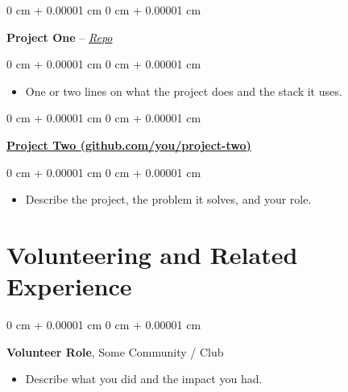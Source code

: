 \documentclass[10pt, letterpaper]{article}
\newenvironment{highlights}{
    \begin{itemize}[
        topsep=0.10 cm,
        parsep=0.10 cm,
        partopsep=0pt,
        itemsep=0pt,
        leftmargin=0 cm + 10pt
    ]
}{
    \end{itemize}
} %
\newenvironment{onecolentry}{
    \begin{adjustwidth}{
        0 cm + 0.00001 cm
    }{
        0 cm + 0.00001 cm
    }
}{
    \end{adjustwidth}
} %
\begin{document}
\begin{onecolentry}
     \textbf{Project One} – \textit{\href{https://github.com/octocat}{Repo}}
\end{onecolentry}
\begin{onecolentry}
    \begin{highlights}
        \item One or two lines on what the project does and the stack it uses.
    \end{highlights}
\end{onecolentry}

\vspace{0.2 cm}

\begin{onecolentry}
    \textbf{\href{https://github.com/octocat}{Project Two (github.com/you/project-two)}}
\end{onecolentry}
\begin{onecolentry}
    \begin{highlights}
        \item Describe the project, the problem it solves, and your role.
    \end{highlights}
\end{onecolentry}


\section{Volunteering and Related Experience}

\begin{onecolentry}
    \textbf{Volunteer Role}, Some Community / Club
\end{onecolentry}
\begin{highlights}
\item Describe what you did and the impact you had.
\end{highlights}
\end{document}
